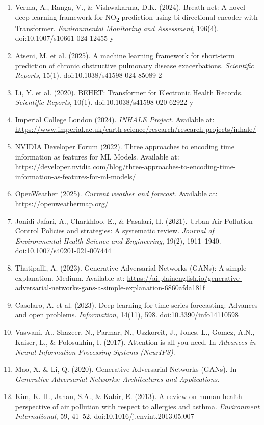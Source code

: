 \documentclass[12pt,a4paper]{report}
\begin{document}
\begin{enumerate}
\item Verma, A., Ranga, V., \& Vishwakarma, D.K. (2024). Breath-net: A novel deep learning framework for NO\textsubscript{2} prediction using bi-directional encoder with Transformer. \emph{Environmental Monitoring and Assessment}, 196(4). doi:10.1007/s10661-024-12455-y

\item Atseni, M. et al. (2025). A machine learning framework for short-term prediction of chronic obstructive pulmonary disease exacerbations. \emph{Scientific Reports}, 15(1). doi:10.1038/s41598-024-85089-2

\item Li, Y. et al. (2020). BEHRT: Transformer for Electronic Health Records. \emph{Scientific Reports}, 10(1). doi:10.1038/s41598-020-62922-y

\item Imperial College London (2024). \emph{INHALE Project}. Available at: \url{https://www.imperial.ac.uk/earth-science/research/research-projects/inhale/}

\item NVIDIA Developer Forum (2022). Three approaches to encoding time information as features for ML Models. Available at: \url{https://developer.nvidia.com/blog/three-approaches-to-encoding-time-information-as-features-for-ml-models/}

\item OpenWeather (2025). \emph{Current weather and forecast}. Available at: \url{https://openweathermap.org/}

\item Jonidi Jafari, A., Charkhloo, E., \& Pasalari, H. (2021). Urban Air Pollution Control Policies and strategies: A systematic review. \emph{Journal of Environmental Health Science and Engineering}, 19(2), 1911--1940. doi:10.1007/s40201-021-007444

\item Thatipalli, A. (2023). Generative Adversarial Networks (GANs): A simple explanation. Medium. Available at: \url{https://ai.plainenglish.io/generative-adversarial-networks-gans-a-simple-explanation-6860afda181f}

\item Casolaro, A. et al. (2023). Deep learning for time series forecasting: Advances and open problems. \emph{Information}, 14(11), 598. doi:10.3390/info14110598

\item Vaswani, A., Shazeer, N., Parmar, N., Uszkoreit, J., Jones, L., Gomez, A.N., Kaiser, L., \& Polosukhin, I. (2017). Attention is all you need. In \emph{Advances in Neural Information Processing Systems (NeurIPS)}.

\item Mao, X. \& Li, Q. (2020). Generative Adversarial Networks (GANs). In \emph{Generative Adversarial Networks: Architectures and Applications}. 

\item Kim, K.-H., Jahan, S.A., \& Kabir, E. (2013). A review on human health perspective of air pollution with respect to allergies and asthma. \emph{Environment International}, 59, 41--52. doi:10.1016/j.envint.2013.05.007


\end{enumerate}
\end{document}
